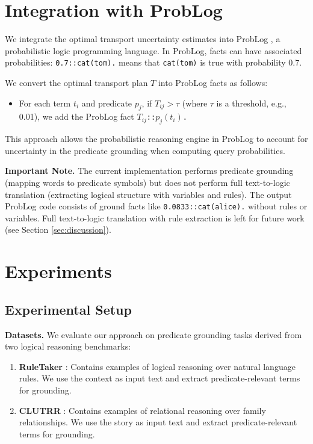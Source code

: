 \documentclass[11pt,letterpaper]{article}
\begin{document}
\section{Integration with ProbLog}

We integrate the optimal transport uncertainty estimates into ProbLog \cite{Raedt2007}, a probabilistic logic programming language. In ProbLog, facts can have associated probabilities: \texttt{0.7::cat(tom).} means that \texttt{cat(tom)} is true with probability 0.7.

We convert the optimal transport plan $T$ into ProbLog facts as follows:
\begin{itemize}[noitemsep]
\item For each term $t_i$ and predicate $p_j$, if $T_{ij} > \tau$ (where $\tau$ is a threshold, e.g., 0.01), we add the ProbLog fact \texttt{$T_{ij}$::$p_j(t_i)$.}
\end{itemize}

This approach allows the probabilistic reasoning engine in ProbLog to account for uncertainty in the predicate grounding when computing query probabilities.

\textbf{Important Note.} The current implementation performs predicate grounding (mapping words to predicate symbols) but does not perform full text-to-logic translation (extracting logical structure with variables and rules). The output ProbLog code consists of ground facts like \texttt{0.0833::cat(alice).} without rules or variables. Full text-to-logic translation with rule extraction is left for future work (see Section \ref{sec:discussion}).

\section{Experiments}

\subsection{Experimental Setup}

\textbf{Datasets.} We evaluate our approach on predicate grounding tasks derived from two logical reasoning benchmarks:

\begin{enumerate}
\item \textbf{RuleTaker} \cite{Clark2020}: Contains examples of logical reasoning over natural language rules. We use the context as input text and extract predicate-relevant terms for grounding.

\item \textbf{CLUTRR} \cite{Sinha2019}: Contains examples of relational reasoning over family relationships. We use the story as input text and extract predicate-relevant terms for grounding.
\end{enumerate}
\end{document}
